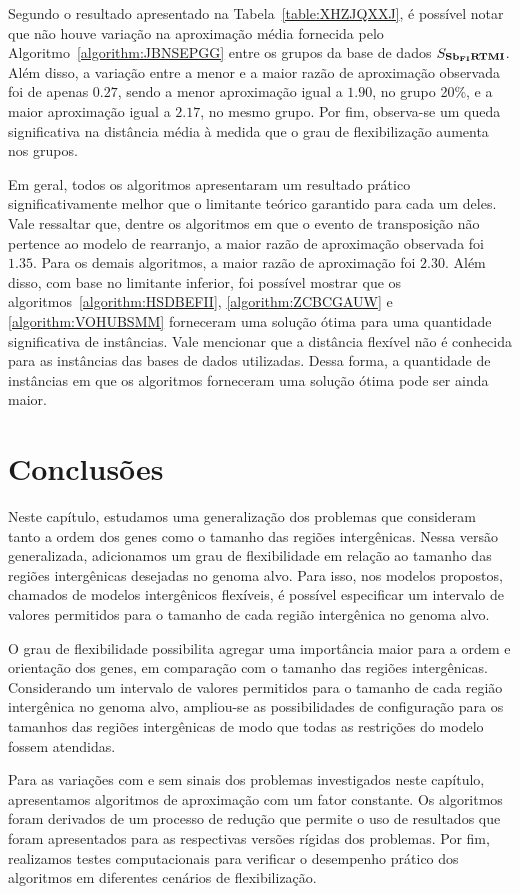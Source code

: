 

Segundo o resultado apresentado na Tabela~\ref{table:XHZJQXXJ}, é possível notar que não houve variação na aproximação média fornecida pelo Algoritmo~\ref{algorithm:JBNSEPGG} entre os grupos da base de dados $S_{\textbf{Sb\textsubscript{FI}RTMI}}{}$. Além disso, a variação entre a menor e a maior razão de aproximação observada foi de apenas $0.27$, sendo a menor aproximação igual a $1.90$, no grupo 20\%, e a maior aproximação igual a $2.17$, no mesmo grupo. Por fim, observa-se um queda significativa na distância média à medida que o grau de flexibilização aumenta nos grupos.

Em geral, todos os algoritmos apresentaram um resultado prático significativamente melhor que o limitante teórico garantido para cada um deles. Vale ressaltar que, dentre os algoritmos em que o evento de transposição não pertence ao modelo de rearranjo, a maior razão de aproximação observada foi $1.35$. Para os demais algoritmos, a maior razão de aproximação foi $2.30$. Além disso, com base no limitante inferior, foi possível mostrar que os algoritmos~\ref{algorithm:HSDBEFII}, \ref{algorithm:ZCBCGAUW} e \ref{algorithm:VOHUBSMM} forneceram uma solução ótima para uma quantidade significativa de instâncias. Vale mencionar que a distância flexível não é conhecida para as instâncias das bases de dados utilizadas. Dessa forma, a quantidade de instâncias em que os algoritmos forneceram uma solução ótima pode ser ainda maior. 

\section{Conclusões}

Neste capítulo, estudamos uma generalização dos problemas que consideram tanto a ordem dos genes como o tamanho das regiões intergênicas. Nessa versão generalizada, adicionamos um grau de flexibilidade em relação ao tamanho das regiões intergênicas desejadas no genoma alvo. Para isso, nos modelos propostos, chamados de modelos intergênicos flexíveis, é possível especificar um intervalo de valores permitidos para o tamanho de cada região intergênica no genoma alvo. 

O grau de flexibilidade possibilita agregar uma importância maior para a ordem e orientação dos genes, em comparação com o tamanho das regiões intergênicas. Considerando um intervalo de valores permitidos para o tamanho de cada região intergênica no genoma alvo, ampliou-se as possibilidades de configuração para os tamanhos das regiões intergênicas de modo que todas as restrições do modelo fossem atendidas.

Para as variações com e sem sinais dos problemas investigados neste capítulo, apresentamos algoritmos de aproximação com um fator constante. Os algoritmos foram derivados de um processo de redução que permite o uso de resultados que foram apresentados para as respectivas versões rígidas dos problemas. Por fim, realizamos testes computacionais para verificar o desempenho prático dos algoritmos em diferentes cenários de flexibilização.